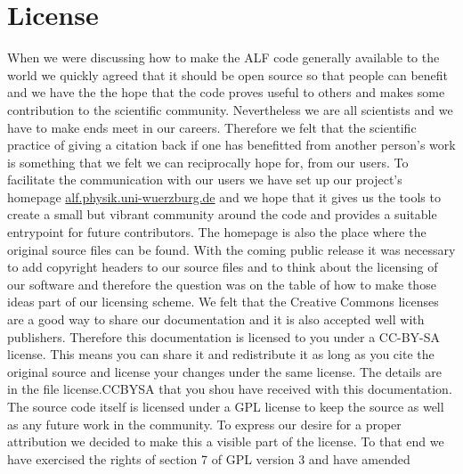 
\section*{License}
When we were discussing how to make the ALF code generally available to the world we quickly
agreed that it should be open source so that people can benefit and we have the the hope that the code 
proves useful to others and makes some contribution to the scientific community.
Nevertheless we are all scientists and we have to make ends meet in our careers. Therefore we felt that the scientific practice 
of giving a citation back if one has benefitted from another person's work is something that we felt we can reciprocally hope for, from our users.
To facilitate the communication with our users we have set up our project's homepage \url{alf.physik.uni-wuerzburg.de}
and we hope that it gives us the tools to create a small but vibrant community around the code and provides a suitable
entrypoint for future contributors.
The homepage is also the place where the original source files can be found.
With the coming public release it was necessary to add copyright headers to our source files and to think about the licensing
of our software and therefore the question was on the table of how to make those ideas part of our licensing scheme.
We felt that the Creative Commons licenses are a good way to share our documentation and it is also
accepted well with publishers. Therefore this documentation is licensed to you under a CC-BY-SA license.
This means you can share it and redistribute it as long as you cite the original source and
license your changes under the same license. The details are in the file license.CCBYSA that you shou have received with this documentation.
The source code itself is licensed under a GPL license to keep the source as well as any future work in the community.
To express our desire for a proper attribution we decided to make this a visible part of the license.
To that end we have exercised the rights of section 7 of GPL version 3 and have amended
